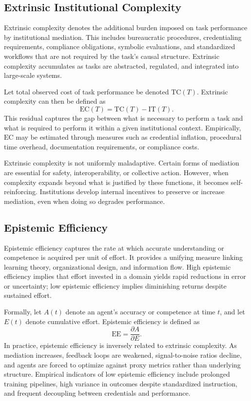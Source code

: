 \documentclass[11pt]{article}
\begin{document}
\subsection{Extrinsic Institutional Complexity}

Extrinsic complexity denotes the additional burden imposed on task performance by institutional mediation. This includes bureaucratic procedures, credentialing requirements, compliance obligations, symbolic evaluations, and standardized workflows that are not required by the task’s causal structure. Extrinsic complexity accumulates as tasks are abstracted, regulated, and integrated into large-scale systems.

Let total observed cost of task performance be denoted \(\mathrm{TC}(T)\). Extrinsic complexity can then be defined as
\[
\mathrm{EC}(T) = \mathrm{TC}(T) - \mathrm{IT}(T).
\]
This residual captures the gap between what is necessary to perform a task and what is required to perform it within a given institutional context. Empirically, \(\mathrm{EC}\) may be estimated through measures such as credential inflation, procedural time overhead, documentation requirements, or compliance costs.

Extrinsic complexity is not uniformly maladaptive. Certain forms of mediation are essential for safety, interoperability, or collective action. However, when complexity expands beyond what is justified by these functions, it becomes self-reinforcing. Institutions develop internal incentives to preserve or increase mediation, even when doing so degrades performance.

\subsection{Epistemic Efficiency}

Epistemic efficiency captures the rate at which accurate understanding or competence is acquired per unit of effort. It provides a unifying measure linking learning theory, organizational design, and information flow. High epistemic efficiency implies that effort invested in a domain yields rapid reductions in error or uncertainty; low epistemic efficiency implies diminishing returns despite sustained effort.

Formally, let \(A(t)\) denote an agent’s accuracy or competence at time \(t\), and let \(E(t)\) denote cumulative effort. Epistemic efficiency is defined as
\[
\mathrm{EE} = \frac{\partial A}{\partial E}.
\]
In practice, epistemic efficiency is inversely related to extrinsic complexity. As mediation increases, feedback loops are weakened, signal-to-noise ratios decline, and agents are forced to optimize against proxy metrics rather than underlying structure. Empirical indicators of low epistemic efficiency include prolonged training pipelines, high variance in outcomes despite standardized instruction, and frequent decoupling between credentials and performance.
\end{document}
